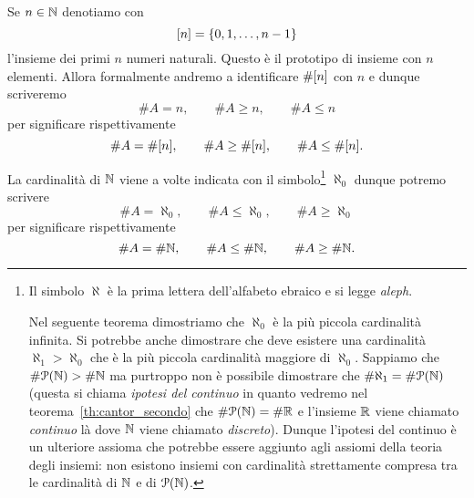\begin{definition}
Se $n\in \mathbb N$ denotiamo con 
\[
  {\left[ n \right]} = {\left\{ 0,1,\dots, n-1 \right\}}
\]
l'insieme dei primi $n$ numeri naturali. 
Questo è il prototipo di insieme con $n$ elementi.
Allora formalmente andremo a identificare $\#{\left[ n \right]}$ con $n$ e 
dunque scriveremo 
\[
   \#A = n, \qquad \#A\ge n, \qquad \#A\le n
\]
per significare rispettivamente
\[
  \#A = \#{\left[ n \right]}, \qquad \#A \ge \#{\left[ n \right]}, \qquad \#A\le \#{\left[ n \right]}.  
\]

La cardinalità di $\mathbb N$ viene a volte indicata con il simbolo\footnote{%
Il simbolo $\aleph$ è la prima lettera dell'alfabeto ebraico 
e si legge \emph{aleph}.

Nel seguente teorema dimostriamo che $\aleph_0$ è la più piccola 
cardinalità infinita. 
Si potrebbe anche dimostrare che deve esistere una cardinalità $\aleph_1>\aleph_0$
che è la più piccola cardinalità maggiore di $\aleph_0$.
Sappiamo che $\# \mathcal P(\mathbb N)>\# \mathbb N$ ma purtroppo non è possibile dimostrare 
che $\# \aleph_1 = \# \mathcal P(\mathbb N)$ (questa si chiama \emph{ipotesi del continuo}
in quanto vedremo nel teorema~\ref{th:cantor_secondo} che $\# \mathcal P(\mathbb N)=\#\mathbb R$
e l'insieme $\mathbb R$ viene chiamato \emph{continuo} là dove $\mathbb N$ 
viene chiamato \emph{discreto}).
Dunque l'ipotesi del continuo è un ulteriore assioma che potrebbe essere 
aggiunto agli assiomi della teoria degli insiemi: 
non esistono insiemi con cardinalità strettamente compresa tra 
le cardinalità di $\mathbb N$ e di $\mathcal P(\mathbb N)$.
}%
%
%
$\aleph_0$ dunque potremo scrivere  
\[
    \# A = \aleph_0, \qquad
    \#A \le \aleph_0, \qquad
    \# A\ge \aleph_0
\]
per significare rispettivamente 
\[
  \# A = \# \mathbb N, \qquad
  \# A \le \# \mathbb N, \qquad
  \# A \ge \# \mathbb N.  
\]
\end{definition}
  
